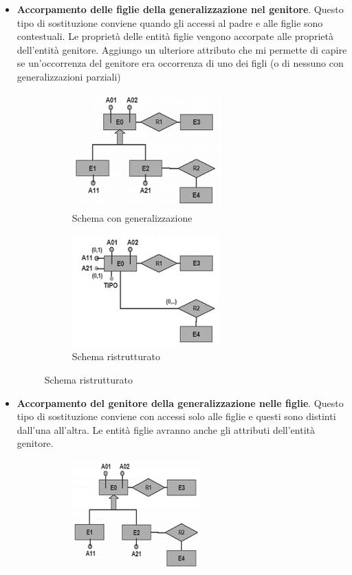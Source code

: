 \begin{itemize}
	\item \textbf{Accorpamento delle figlie della generalizzazione nel genitore}. Questo tipo di sostituzione conviene quando gli accessi al padre e alle figlie sono contestuali.
	Le proprietà delle entità figlie vengono accorpate alle proprietà dell'entità genitore. Aggiungo un ulteriore attributo che mi permette di capire se un'occorrenza del genitore era occorrenza di uno dei figli (o di nessuno con generalizzazioni parziali)
	\begin{figure}[h]
		\begin{subfigure}{0.5\textwidth}
			\includegraphics{images/100.PNG} 
			\caption{Schema con generalizzazione}
		\end{subfigure}
		\begin{subfigure}{0.5\textwidth}
			\includegraphics{images/101.PNG}
			\caption{Schema ristrutturato}
		\end{subfigure}
	\end{figure}
	\item \textbf{Accorpamento del genitore della generalizzazione nelle figlie}. Questo tipo di sostituzione conviene con accessi solo alle figlie e questi sono distinti dall'una all'altra. Le entità figlie avranno anche gli attributi dell'entità genitore.
	\begin{figure}[h]
		\begin{subfigure}{0.5\textwidth}
			\includegraphics{images/102.PNG} 

\end{subfigure}
\end{figure}
\end{itemize}
